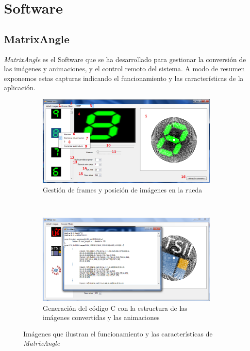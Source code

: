 \section{Software}
\subsection{MatrixAngle}
\label{sec:matrixAngle}
\textsl{MatrixAngle} es el Software que se ha desarrollado para gestionar la
conversión de las imágenes y animaciones, y el control remoto del sistema. A
modo de resumen exponemos estas capturas indicando el funcionamiento y las
características de la aplicación.

\begin{figure}[!ht]
	\centering

	\begin{subfigure}[t]{\textwidth}
		\centering
		\includegraphics[width=\textwidth]{images/matrixAngle1}
		\caption{Gestión de frames y posición de imágenes en la rueda}
		\label{fig:matrixAngle1}
	\end{subfigure}
	\\
	\begin{subfigure}[b]{\textwidth}
		\centering
		\includegraphics[width=\textwidth]{images/matrixAngle2}
		\caption{Generación del código C con la estructura de las
		imágenes convertidas y las animaciones}
		\label{fig:matrixAngle2}
	\end{subfigure}

	\caption{Imágenes que ilustran el funcionamiento y las características
	de \textsl{MatrixAngle}}
\end{figure}

